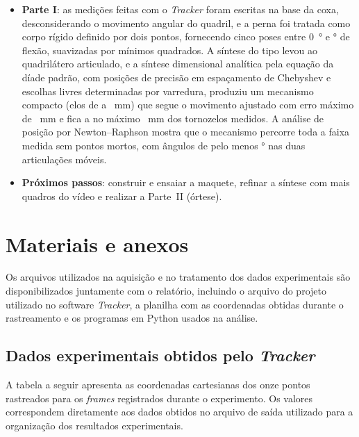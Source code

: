\documentclass[12pt,a4paper,twoside]{article}
\numberwithin{equation}{section}
\begin{document}
\begin{itemize}
  \item \textbf{Parte I}: as medições feitas com o \emph{Tracker} foram escritas na base da
  coxa, desconsiderando o movimento angular do quadril, e a perna foi tratada como corpo
  rígido definido por dois pontos, fornecendo cinco poses entre \SI{0}{\degree} e
  \phiE\si{\degree} de flexão, suavizadas por mínimos quadrados. A síntese do tipo levou ao
  quadrilátero articulado, e a síntese dimensional analítica pela equação da díade padrão,
  com posições de precisão em espaçamento de Chebyshev e escolhas livres determinadas por
  varredura, produziu um mecanismo compacto (elos de \rminelo{} a \rmaxelo~mm) que segue o
  movimento ajustado com erro máximo de \ecurva~mm e fica a no máximo \emedmax~mm dos
  tornozelos medidos. A análise de posição por Newton--Raphson mostra que o mecanismo
  percorre toda a faixa medida sem pontos mortos, com ângulos de pelo menos
  \mumindois\si{\degree} nas duas articulações móveis.
  \item \textbf{Próximos passos}: construir e ensaiar a maquete, refinar a síntese com mais
  quadros do vídeo e realizar a Parte~II (órtese).
\end{itemize}

\section{Materiais e anexos}\label{sec:anexos}

Os arquivos utilizados na aquisição e no tratamento dos dados experimentais são
disponibilizados juntamente com o relatório, incluindo o arquivo do projeto utilizado
no software \emph{Tracker}, a planilha com as coordenadas obtidas durante o rastreamento
e os programas em Python usados na análise.

\subsection{Dados experimentais obtidos pelo \emph{Tracker}}

A tabela a seguir apresenta as coordenadas cartesianas dos onze pontos rastreados para os
\emph{frames} registrados durante o experimento. Os valores correspondem diretamente aos
dados obtidos no arquivo de saída utilizado para a organização dos resultados
experimentais.
\end{document}
